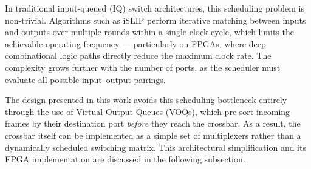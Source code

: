 In traditional input-queued (IQ) switch architectures, this scheduling problem is non-trivial. 
Algorithms such as iSLIP perform iterative matching between inputs and outputs over 
multiple rounds within a single clock cycle, which limits the achievable operating frequency 
--- particularly on FPGAs, where deep combinational logic paths directly reduce the maximum 
clock rate. The complexity grows further with the number of ports, as the scheduler must 
evaluate all possible input--output pairings.

The design presented in this work avoids this scheduling bottleneck entirely through the use 
of Virtual Output Queues (VOQs), which pre-sort incoming frames by their destination port 
\emph{before} they reach the crossbar. As a result, the crossbar itself can be implemented as a 
simple set of multiplexers rather than a dynamically scheduled switching matrix. This 
architectural simplification and its FPGA implementation are discussed in the following 
subsection.